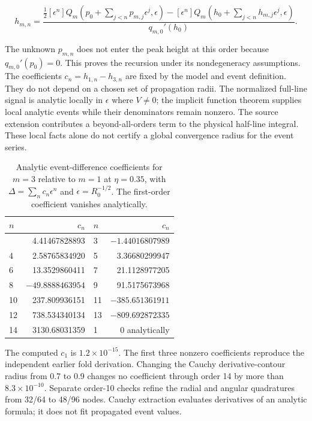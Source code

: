 \begin{equation}h_{m,n}=\frac{\tfrac12[\epsilon^n]Q_m(p_0+\sum_{j<n}p_{m,j}\epsilon^j,\epsilon)-[\epsilon^n]Q_m(h_0+\sum_{j<n}h_{m,j}\epsilon^j,\epsilon)}{q_{m,0}'(h_0)}.\end{equation}

The unknown \(p_{m,n}\) does not enter the peak height at this order
because \(q_{m,0}'(p_0)=0\). This proves the recursion under its
nondegeneracy assumptions. The coefficients \(c_n=h_{1,n}-h_{3,n}\) are
fixed by the model and event definition. They do not depend on a chosen
set of propagation radii. The normalized full-line signal is analytic
locally in \(\epsilon\) where \(V\neq0\); the implicit function theorem
supplies local analytic events while their denominators remain nonzero.
The source extension contributes a beyond-all-orders term to the
physical half-line integral. These local facts alone do not certify a
global convergence radius for the event series.

\begin{longtable}[]{@{}lrlr@{}}
\caption{Analytic event-difference coefficients for $m=3$ relative to $m=1$ at $\eta=0.35$, with $\Delta=\sum_n c_n\epsilon^n$ and $\epsilon=R_0^{-1/2}$. The first-order coefficient vanishes analytically.}\label{tab:event-series-coefficients}\\
\toprule\noalign{}
\(n\) & \(c_n\) & \(n\) & \(c_n\) \\
\midrule\noalign{}
\endhead
\bottomrule\noalign{}
\endlastfoot
2 & 4.41467828893 & 3 & $-1.44016807989$ \\
4 & 2.58765834920 & 5 & 3.36680299947 \\
6 & 13.3529860411 & 7 & 21.1128977205 \\
8 & $-49.8888463954$ & 9 & 91.5175673968 \\
10 & 237.809936151 & 11 & $-385.651361911$ \\
12 & 738.534340134 & 13 & $-809.692872335$ \\
14 & 3130.68031359 & 1 & 0 analytically \\
\end{longtable}

The computed \(c_1\) is \(1.2\times10^{-15}\). The first three nonzero
coefficients reproduce the independent earlier fold derivation. Changing
the Cauchy derivative-contour radius from 0.7 to 0.9 changes no
coefficient through order 14 by more than \(8.3\times10^{-10}\).
Separate order-10 checks refine the radial and angular quadratures from
32/64 to 48/96 nodes. Cauchy extraction evaluates derivatives of an
analytic formula; it does not fit propagated event values.

